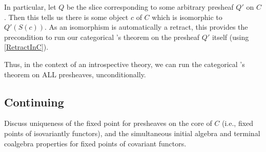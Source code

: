 In particular, let $Q$ be the slice corresponding to some arbitrary presheaf $Q'$ on $C$. Then this tells us there is some object $c$ of $C$ which is isomorphic to $Q'(S(c))$. As an isomorphism is automatically a retract, this provides the precondition to run our categorical \Loeb's theorem on the presheaf $Q'$ itself (using \cref{RetractInC}).

Thus, in the context of an introspective theory, we can run the categorical \Loeb's theorem on ALL presheaves, unconditionally.

\subsection{Continuing}

\begin{TODOblock}
Discuss uniqueness of the fixed point for presheaves on the core of $C$ (i.e., fixed points of isovariantly functors), and the simultaneous initial algebra and terminal coalgebra properties for fixed points of covariant functors.
\end{TODOblock}